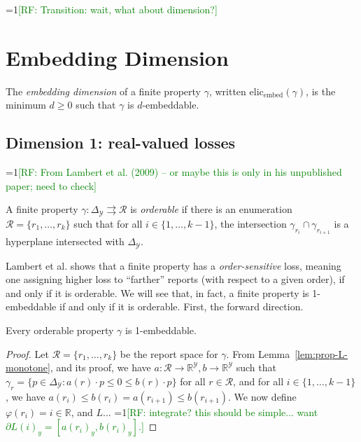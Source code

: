 \documentclass[11pt]{colt2019}
\newcommand{\Comments}{1}
\newcommand{\mynote}[2]{\ifnum\Comments=1\textcolor{#1}{#2}\fi}
\newcommand{\raf}[1]{\mynote{green}{[RF: #1]}}
\newcommand{\reals}{\mathbb{R}}
\newcommand{\elicembed}{\mathrm{elic}_\mathrm{embed}}
\newcommand{\simplex}{\Delta_\Y}
\newcommand{\R}{\mathcal{R}}
\newcommand{\Y}{\mathcal{Y}}
\newcommand{\toto}{\rightrightarrows}
\begin{document}
\raf{Transition: wait, what about dimension?}

\section{Embedding Dimension}

\begin{definition}
  The \emph{embedding dimension} of a finite property $\gamma$, written $\elicembed(\gamma)$, is the minimum $d\geq 0$ such that $\gamma$ is $d$-embeddable.
\end{definition}

\subsection{Dimension 1: real-valued losses}

\raf{From Lambert et al. (2009) -- or maybe this is only in his unpublished paper; need to check}
\begin{definition}
  A finite property $\gamma:\simplex\toto\R$ is \emph{orderable} if there is an enumeration $\R = \{r_1,\ldots,r_k\}$ such that for all $i\in\{1,\ldots,k-1\}$, the intersection $\gamma_{r_i} \cap \gamma_{r_{i+1}}$ is a hyperplane intersected with $\simplex$.
\end{definition}

Lambert et al. shows that a finite property has a \emph{order-sensitive} loss, meaning one assigning higher loss to ``farther'' reports (with respect to a given order), if and only if it is orderable.
We will see that, in fact, a finite property is 1-embeddable if and only if it is orderable.
First, the forward direction.

\begin{proposition}\label{prop:orderable-embed}
  Every orderable property $\gamma$ is 1-embeddable.
\end{proposition}
\begin{proof}
  Let $\R = \{r_1,\ldots,r_k\}$ be the report space for $\gamma$.
  From Lemma~\ref{lem:prop-L-monotone}, and its proof, we have $a:\R\to\reals^\Y, b\to\reals^\Y$ such that $\gamma_r = \{p\in\simplex : a(r) \cdot p \leq 0 \leq b(r) \cdot p\}$ for all $r\in\R$, and for all $i \in \{1,\ldots,k-1\}$, we have $a(r_i) \leq b(r_i) = a(r_{i+1}) \leq b(r_{i+1})$.
  We now define $\varphi(r_i) = i \in \reals$, and $L$... \raf{integrate?  this should be simple... want $\partial L(i)_y = [a(r_i)_y,b(r_i)_y]$.}
\end{proof}
\end{document}
